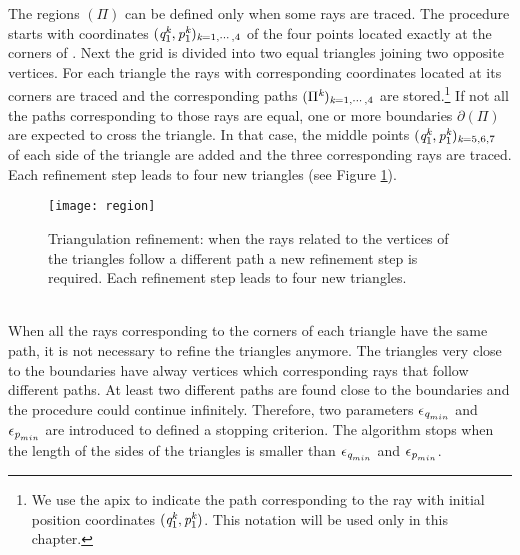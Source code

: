 The regions $(\Pi)$ can be defined only when some rays are traced.
The procedure starts with coordinates $(\textit{q}_1^{\textit{k}},\textit{p}_1^{\textit{k}})_{\textit{k}=1, \cdots, 4}$ of the four points located exactly at the corners of .
Next the grid is divided into two equal triangles joining two opposite vertices. For each triangle the rays with corresponding coordinates located at its corners are traced and the corresponding paths $(\Pi^{\textit{k}})_{\textit{k}=1, \cdots, 4}$ are stored.\footnote{We use the apix  to indicate the path corresponding to the ray with initial position coordinates $(\textit{q}_1^{\textit{k}},\textit{p}_1^{\textit{k}})$. This notation will be used only in this chapter.}
If not all the paths corresponding to
those rays are equal, one or more boundaries
$\partial$$(\Pi)$ are expected to cross the triangle.
In that case, the middle points $(\textit{q}_1^{\textit{k}},\textit{p}_1^{\textit{k}})_{\textit{k}=5,6,7}$ of each side of the triangle are added and
the three corresponding rays are traced. Each refinement step leads to four new triangles (see Figure \ref{fig:refinement}).
 \begin{figure}[h]
  \begin{center}
  \texttt{[image: region]}
  \end{center}
  \caption{Triangulation refinement:
  when the rays related to the vertices of the triangles follow a different path a new refinement step is required.
   Each refinement step leads to four new triangles.}
  \label{fig:refinement}
\end{figure}
  \\ \indent
When all the rays corresponding to the corners of each triangle have the same path, it is not necessary to refine the triangles anymore. 
The triangles very close to the boundaries have alway vertices which corresponding rays that follow different paths. 
At least two different paths are found close to the boundaries and the procedure could continue infinitely.
Therefore, two parameters $\epsilon_{\textit{q}_{min}}$ and $\epsilon_{\textit{p}_{min}}$ are introduced to defined a stopping criterion.
The algorithm stops when the length of the sides of the triangles is smaller than $\epsilon_{\textit{q}_{min}}$ and $\epsilon_{\textit{p}_{min}}$.
